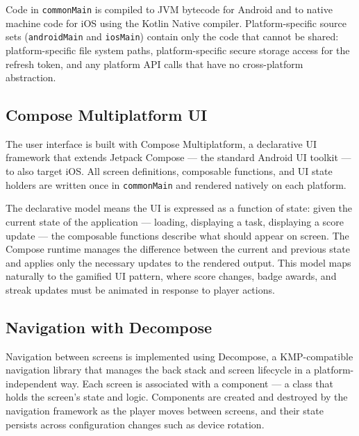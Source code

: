 Code in \texttt{commonMain} is compiled to JVM bytecode for Android and to native machine code for iOS using the Kotlin Native compiler. Platform-specific source sets (\texttt{androidMain} and \texttt{iosMain}) contain only the code that cannot be shared: platform-specific file system paths, platform-specific secure storage access for the refresh token, and any platform API calls that have no cross-platform abstraction.


\subsection{Compose Multiplatform UI}

The user interface is built with Compose Multiplatform, a declarative UI framework that extends Jetpack Compose --- the standard Android UI toolkit --- to also target iOS. All screen definitions, composable functions, and UI state holders are written once in \texttt{commonMain} and rendered natively on each platform.

The declarative model means the UI is expressed as a function of state: given the current state of the application --- loading, displaying a task, displaying a score update --- the composable functions describe what should appear on screen. The Compose runtime manages the difference between the current and previous state and applies only the necessary updates to the rendered output. This model maps naturally to the gamified UI pattern, where score changes, badge awards, and streak updates must be animated in response to player actions.


\subsection{Navigation with Decompose}

Navigation between screens is implemented using Decompose, a KMP-compatible navigation library that manages the back stack and screen lifecycle in a platform-independent way. Each screen is associated with a component --- a class that holds the screen's state and logic. Components are created and destroyed by the navigation framework as the player moves between screens, and their state persists across configuration changes such as device rotation.

